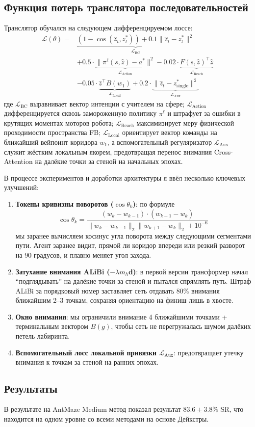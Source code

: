 \subsection{Функция потерь транслятора последовательностей}

Транслятор обучался на следующем дифференцируемом лоссе:
\begin{equation}
\label{eq:seq_loss}
\begin{split}
\mathcal{L}(\theta) = {} & \underbrace{(1 - \cos(\hat{z}_t, z^*_t)) + 0.1 \|\hat{z}_t - z^*_t\|^2}_{\mathcal{L}_{\text{BC}}} \\
& + 0.5 \cdot \underbrace{\|\pi^\ell(s, \hat{z}) - a^*\|^2}_{\mathcal{L}_{\text{Action}}} - 0.02 \cdot \underbrace{F(s, \hat{z})^\top \hat{z}}_{\mathcal{L}_{\text{Reach}}} \\
& - 0.05 \cdot \underbrace{\hat{z}^\top B(w_1)}_{\mathcal{L}_{\text{Local}}} + 0.2 \cdot \underbrace{\|\hat{z}_t - z^*_{\text{single}}\|^2}_{\mathcal{L}_{\text{Aux}}}
\end{split}
\end{equation}
где $\mathcal{L}_{\text{BC}}$ выравнивает вектор интенции с учителем на сфере; $\mathcal{L}_{\text{Action}}$ дифференцируется сквозь замороженную политику $\pi^\ell$ и штрафует за ошибки в крутящих моментах моторов робота; $\mathcal{L}_{\text{Reach}}$ максимизирует меру физической проходимости пространства FB; $\mathcal{L}_{\text{Local}}$ ориентирует вектор команды на ближайший вейпоинт коридора $w_1$, а вспомогательный регуляризатор $\mathcal{L}_{\text{Aux}}$ служит жёстким локальным якорем, предотвращая перенос внимания Cross-Attention на далёкие точки за стеной на начальных эпохах.

В процессе экспериментов и доработки архитектуры я ввёл несколько ключевых улучшений:
\begin{enumerate}[leftmargin=*,noitemsep]
    \item \textbf{Токены кривизны поворотов ($\cos \theta_k$)}: по формуле
    \begin{equation}
        \label{eq:curvature_angle}
        \cos \theta_k = \frac{(w_k - w_{k-1}) \cdot (w_{k+1} - w_k)}{\|w_k - w_{k-1}\|_2 \|w_{k+1} - w_k\|_2 + 10^{-6}}
    \end{equation}
    мы заранее вычисляем косинус угла поворота между следующими сегментами пути. Агент заранее видит, прямой ли коридор впереди или резкий разворот на 90 градусов, и плавно меняет угол захода.
    \item \textbf{Затухание внимания ALiBi ($-\lambda m_h \mathbf{d}$)}: в первой версии трансформер начал \enquote{подглядывать} на далёкие точки за стеной и пытался спрямлять путь. Штраф ALiBi за порядковый номер заставляет сеть отдавать 80\% внимания ближайшим 2--3 точкам, сохраняя ориентацию на финиш лишь в хвосте.
    \item \textbf{Окно внимания}: мы ограничили внимание 4 ближайшими точками + терминальным вектором $B(g)$, чтобы сеть не перегружалась шумом далёких петель лабиринта.
    \item \textbf{Вспомогательный лосс локальной привязки $\mathcal{L}_{\text{Aux}}$}: предотвращает утечку внимания к точкам за стеной на ранних эпохах.
\end{enumerate}

\subsection{Результаты}
В результате на AntMaze Medium метод показал результат $83.6 \pm 3.8\%$ SR, что находится на одном уровне со всеми методами на основе Дейкстры. 
